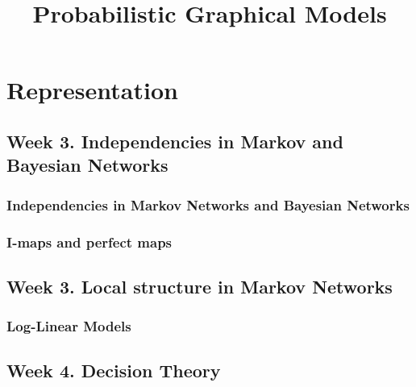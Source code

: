 \documentclass[a4paper,10pt]{article}
\title{Probabilistic Graphical Models}
\author{}
\begin{document}
\maketitle

\section{Representation}

\subsection{Week 3. Independencies in Markov and Bayesian Networks}

\subsubsection{Independencies in Markov Networks and Bayesian Networks}



\subsubsection{I-maps and perfect maps}



\subsection{Week 3. Local structure in Markov Networks}

\subsubsection{Log-Linear Models}




\subsection{Week 4. Decision Theory}


\end{document}
